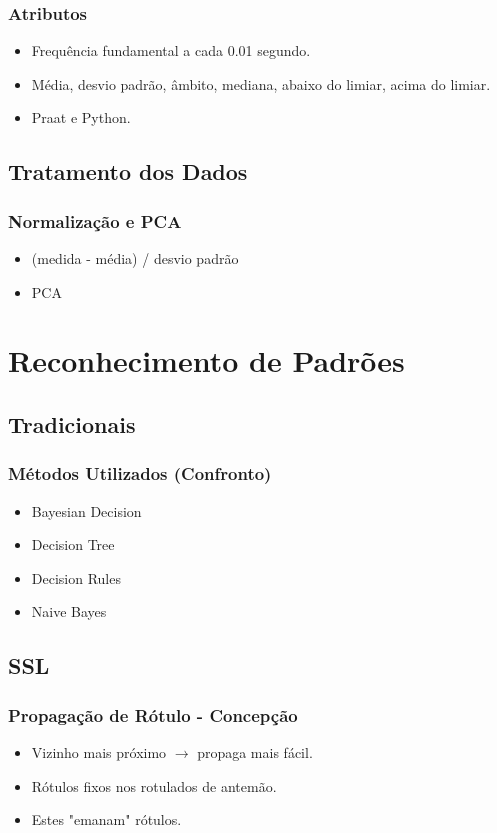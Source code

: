 \documentclass{beamer}
\begin{document}
      \frame
      {
        \frametitle{Atributos}
          \begin{itemize}
          \item Frequência fundamental a cada 0.01 segundo.
          \item Média, desvio padrão, âmbito, mediana, abaixo do limiar, acima do limiar.
          \item Praat e Python.
        \end{itemize}
      }

   \subsection{Tratamento dos Dados}
      \frame
      {
        \frametitle{Normalização e PCA}
          \begin{itemize}
          \item (medida - média) / desvio padrão
          \item PCA
        \end{itemize}
      }

  \section{Reconhecimento de Padrões}
    \frame{\tableofcontents[current]}
    \subsection{Tradicionais}
      \frame
      {
        \frametitle{Métodos Utilizados (Confronto)}
        \begin{itemize}
          \item Bayesian Decision
          \item Decision Tree
          \item Decision Rules
          \item Naive Bayes
        \end{itemize}
      }
    \subsection{SSL}

      \frame
      {
        \frametitle{Propagação de Rótulo - Concepção}
        \begin{itemize}
          \item Vizinho mais próximo $\rightarrow$ propaga mais fácil.
          \item Rótulos fixos nos rotulados de antemão.
          \item Estes "emanam" rótulos.
        \end{itemize}
      }
\end{document}
